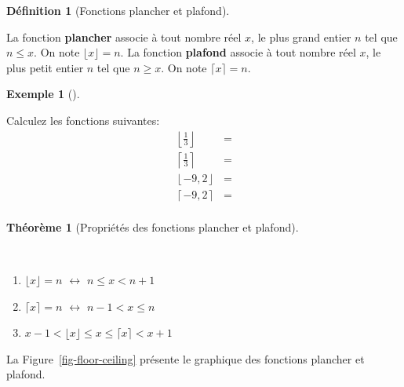 \documentclass[
  letterpaper,
]{scrbook}
\providecommand{\tightlist}{%
  \setlength{\itemsep}{0pt}\setlength{\parskip}{0pt}}\usepackage{longtable,booktabs,array}
\theoremstyle{plain}
\newtheorem{theorem}{Théorème}[chapter]
\theoremstyle{definition}
\newtheorem{example}{Exemple}[chapter]
\theoremstyle{definition}
\newtheorem{definition}{Définition}[chapter]
\theoremstyle{remark}
\begin{document}
\leavevmode{}%
\begin{definition}[Fonctions plancher et
plafond]\label{def-fonction-plancher-plafond}

La fonction \textbf{plancher} associe à tout nombre réel \(x\), le plus
grand entier \(n\) tel que \(n\leq x\). On note
\(\lfloor x\rfloor = n\). La fonction \textbf{plafond} associe à tout
nombre réel \(x\), le plus petit entier \(n\) tel que \(n\geq x\). On
note \(\lceil x \rceil = n\).

\end{definition}

\leavevmode{}%
\begin{example}[]\label{exm-fonction-plancher-et-plafond}

Calculez les fonctions suivantes: \begin{align*}
\left\lfloor \frac{1}{3}\right\rfloor &= \\
\left\lceil \frac{1}{3}\right\rceil &= \\
\left\lfloor -9,2\right\rfloor &= \\
\left\lceil -9,2\right\rceil &= \\
\end{align*}

\end{example}

\leavevmode{}%
\begin{theorem}[Propriétés des fonctions plancher et
plafond]\label{thm-proprietes-plancher-plafond}

~

\begin{enumerate}
\def\labelenumi{\arabic{enumi}.}
\tightlist
\item
  \(\lfloor x\rfloor = n\) \(\leftrightarrow\) \(n\leq x<n+1\)
\item
  \(\lceil x\rceil = n\) \(\leftrightarrow\) \(n-1< x\leq n\)
\item
  \(x-1<\lfloor x\rfloor \leq x \leq \lceil x \rceil < x+1\)
\end{enumerate}

\end{theorem}

La Figure~\ref{fig-floor-ceiling} présente le graphique des fonctions
plancher et plafond.
\end{document}
